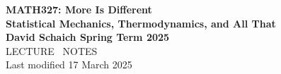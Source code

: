 \documentclass[12 pt]{article} %
\begin{document}
\thispagestyle{empty}
\begin{center}
  {\LARGE \textbf{MATH327: More Is Different}} \\[6 pt]
  {\Large \textbf{Statistical Mechanics, Thermodynamics, and All That}} \\[6 pt]
  \textbf{David Schaich \qquad\qquad\qquad\qquad Spring Term 2025} \\[48 pt]
  {\LARGE LECTURE \ NOTES} \\[6 pt]
  Last modified 17 March 2025
\end{center}
\renewcommand{\contentsname}{}
\setcounter{tocdepth}{1}
\tableofcontents



\newpage


\newpage


\newpage


\newpage


\newpage


\newpage


\newpage


\newpage


\newpage


\newpage


\newpage




\end{document}
